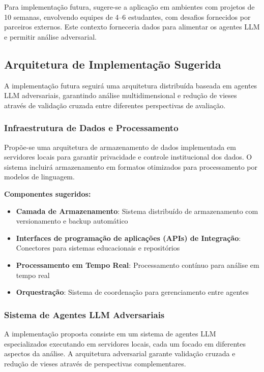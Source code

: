 \documentclass[english, spanish, brazilian]{modelo_dt}
\begin{document}
Para implementação futura, sugere-se a aplicação em ambientes com projetos de 10 semanas, envolvendo equipes de 4--6 estudantes, com desafios fornecidos por parceiros externos. Este contexto forneceria dados para alimentar os agentes LLM e permitir análise adversarial.

\subsection{Arquitetura de Implementação Sugerida}

A implementação futura seguirá uma arquitetura distribuída baseada em agentes LLM adversariais, garantindo análise multidimensional e redução de vieses através de validação cruzada entre diferentes perspectivas de avaliação.

\subsubsection{Infraestrutura de Dados e Processamento}

Propõe-se uma arquitetura de armazenamento de dados implementada em servidores locais para garantir privacidade e controle institucional dos dados. O sistema incluirá armazenamento em formatos otimizados para processamento por modelos de linguagem.

\textbf{Componentes sugeridos:}
\begin{itemize}
\item \textbf{Camada de Armazenamento}: Sistema distribuído de armazenamento com versionamento e backup automático
\item \textbf{Interfaces de programação de aplicações (APIs) de Integração}: Conectores para sistemas educacionais e repositórios
\item \textbf{Processamento em Tempo Real}: Processamento contínuo para análise em tempo real
\item \textbf{Orquestração}: Sistema de coordenação para gerenciamento entre agentes
\end{itemize}

\subsubsection{Sistema de Agentes LLM Adversariais}

A implementação proposta consiste em um sistema de agentes LLM especializados executando em servidores locais, cada um focado em diferentes aspectos da análise. A arquitetura adversarial garante validação cruzada e redução de vieses através de perspectivas complementares.
\end{document}
